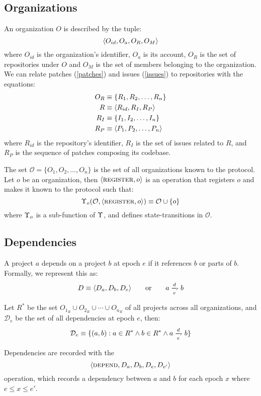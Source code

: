 \subsection{Organizations}
\label{orgs}

An organization $O$ is described by the tuple:
\[
    \langle O_{id}, O_{a}, O_R, O_M \rangle
\]
where $O_{id}$ is the organization's identifier, $O_a$ is its account, $O_R$ is
the set of repositories under $O$ and $O_M$ is the set of members belonging to
the organization. We can relate patches (\ref{patches}) and issues
(\ref{issues}) to repositories with the equations:
\begin{align*}
    O_R & \equiv \{R_1, R_2, \dotsc, R_n\}         \\
    R   & \equiv \langle R_{id}, R_I, R_P \rangle         \\
    R_I & \equiv \{I_1, I_2, \dotsc, I_n\}         \\
    R_P & \equiv \langle P_1, P_2, \dotsc, P_n \rangle
\end{align*}
where $R_{id}$ is the repository's identifier, $R_I$ is the set of issues
related to $R$, and $R_P$ is the sequence of patches composing its codebase.

The set $\mathcal{O} = \{O_1, O_2, \dotsc, O_n\}$ is the set of all organizations
known to the protocol.  Let $o$ be an organization, then $\langle \text{\normalfont\scshape register}, o \rangle$ is
an operation that registers $o$ and makes it known to the protocol such that:
\[
    \Upsilon_o(\mathcal{O}, \langle \text{\normalfont\scshape register}, o \rangle)
    \equiv \mathcal{O} \cup \{o\}
\]
where $\Upsilon_o$ is a sub-function of $\Upsilon$, and defines
state-transitions in $\mathcal{O}$.

\subsection{Dependencies}
\label{dependencies}

A project $a$ depends on a project $b$ at epoch $e$ if it references $b$
or parts of $b$. Formally, we represent this as:
\[
    D \equiv \tuple{D_a, D_b, D_e} \qquad \text{or} \qquad a \dep b
\]


Let $R^*$ be the set $O_{1_R} \cup O_{2_R} \cup \cdots \cup
O_{n_R}$ of all projects across all organizations, and $\mathcal{D}_e$ be the
set of all dependencies at epoch $e$, then:
\[
    \mathcal{D}_e \equiv \{(a, b) : a \in R^*
    \land b \in R^*
    \land a \dep b \}
\]

Dependencies are recorded with the
\[
    \langle \text{\normalfont\scshape depend}, D_a, D_b, D_e, D_{e'} \rangle
\]
operation, which records a dependency between $a$ and $b$ for each epoch $x$
where $e \leqslant x \leqslant e'$.
